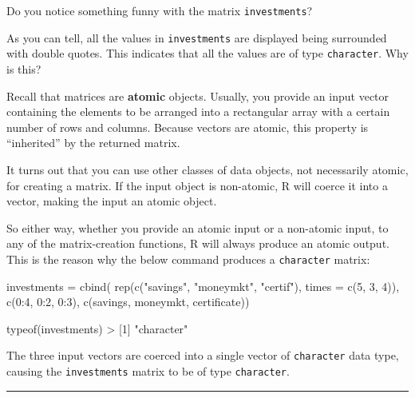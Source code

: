 \documentclass[
]{book}
\newenvironment{Shaded}{\begin{snugshade}}{\end{snugshade}}
\newcommand{\AttributeTok}[1]{\textcolor[rgb]{0.77,0.63,0.00}{#1}}
\newcommand{\DecValTok}[1]{\textcolor[rgb]{0.00,0.00,0.81}{#1}}
\newcommand{\FunctionTok}[1]{\textcolor[rgb]{0.00,0.00,0.00}{#1}}
\newcommand{\NormalTok}[1]{#1}
\newcommand{\OtherTok}[1]{\textcolor[rgb]{0.56,0.35,0.01}{#1}}
\newcommand{\SpecialCharTok}[1]{\textcolor[rgb]{0.00,0.00,0.00}{#1}}
\newcommand{\StringTok}[1]{\textcolor[rgb]{0.31,0.60,0.02}{#1}}
\begin{document}
Do you notice something funny with the matrix \texttt{investments}?

As you can tell, all the values in \texttt{investments} are displayed being surrounded
with double quotes. This indicates that all the values are of type \texttt{character}.
Why is this?

Recall that matrices are \textbf{atomic} objects. Usually, you provide an input
vector containing the elements to be arranged into a rectangular array with
a certain number of rows and columns. Because vectors are atomic, this property
is ``inherited'' by the returned matrix.

It turns out that you can use other classes of data objects, not necessarily
atomic, for creating a matrix. If the input object is non-atomic, R will
coerce it into a vector, making the input an atomic object.

So either way, whether you provide an atomic input or a non-atomic input,
to any of the matrix-creation functions, R will always produce an atomic
output. This is the reason why the below command produces a \texttt{character} matrix:

\begin{Shaded}
\begin{Highlighting}[]
\NormalTok{investments }\OtherTok{=} \FunctionTok{cbind}\NormalTok{(}
  \FunctionTok{rep}\NormalTok{(}\FunctionTok{c}\NormalTok{(}\StringTok{"savings"}\NormalTok{, }\StringTok{"moneymkt"}\NormalTok{, }\StringTok{"certif"}\NormalTok{), }\AttributeTok{times =} \FunctionTok{c}\NormalTok{(}\DecValTok{5}\NormalTok{, }\DecValTok{3}\NormalTok{, }\DecValTok{4}\NormalTok{)),}
  \FunctionTok{c}\NormalTok{(}\DecValTok{0}\SpecialCharTok{:}\DecValTok{4}\NormalTok{, }\DecValTok{0}\SpecialCharTok{:}\DecValTok{2}\NormalTok{, }\DecValTok{0}\SpecialCharTok{:}\DecValTok{3}\NormalTok{), }
  \FunctionTok{c}\NormalTok{(savings, moneymkt, certificate))}

\FunctionTok{typeof}\NormalTok{(investments)}
\SpecialCharTok{\textgreater{}}\NormalTok{ [}\DecValTok{1}\NormalTok{] }\StringTok{"character"}
\end{Highlighting}
\end{Shaded}

The three input vectors are coerced into a single vector of \texttt{character} data
type, causing the \texttt{investments} matrix to be of type \texttt{character}.

\begin{center}\rule{0.5\linewidth}{0.5pt}\end{center}
\end{document}
